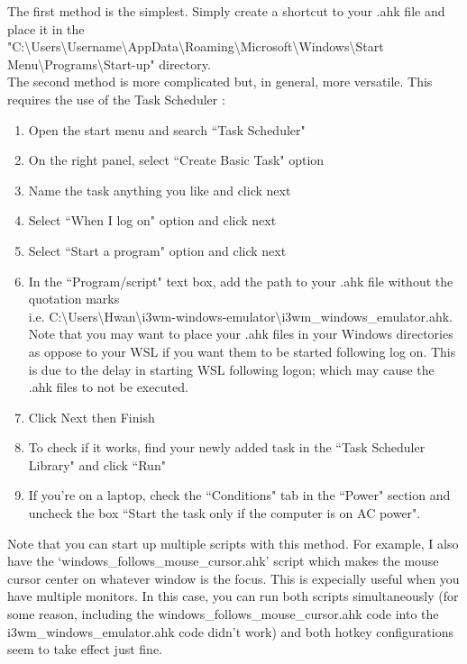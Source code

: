 The first method is the simplest. Simply create a shortcut to your .ahk file
and place it in the\\
"C:\textbackslash Users\textbackslash Username\textbackslash AppData\textbackslash Roaming\textbackslash Microsoft\textbackslash Windows\textbackslash Start Menu\textbackslash Programs\textbackslash Start-up" directory.\\

The second method is more complicated but, in general, more versatile. This
requires the use of the Task Scheduler \cite{bashkarla2016how}:
\begin{enumerate}
    \item Open the start menu and search ``Task Scheduler"
    \item On the right panel, select ``Create Basic Task" option
    \item Name the task anything you like and click next
    \item Select ``When I log on" option and click next
    \item Select ``Start a program" option and click next
    \item In the ``Program/script" text box, add the path to your .ahk file
        without the quotation marks\\
        i.e. C:\textbackslash Users\textbackslash Hwan\textbackslash i3wm-windows-emulator\textbackslash i3wm\_windows\_emulator.ahk.\\
        Note that you may want to place your .ahk files in your Windows
        directories as oppose to your WSL if you want them to be started
        following log on. This is due to the delay in starting WSL following
        logon; which may cause the .ahk files to not be executed.
    \item Click Next then Finish
    \item To check if it works, find your newly added task in the ``Task Scheduler Library" and
       click ``Run"
   \item If you're on a laptop, check the ``Conditions" tab in the ``Power"
       section and uncheck the box ``Start the task only if the computer is on
       AC power".
\end{enumerate}
Note that you can start up multiple scripts with this method. For example, I
also have the `windows\_follows\_mouse\_cursor.ahk' script which makes the mouse
cursor center on whatever window is the focus. This is expecially useful when
you have multiple monitors. In this case, you can run both scripts
simultaneously (for some reason, including the
windows\_follows\_mouse\_cursor.ahk code into the i3wm\_windows\_emulator.ahk
code didn't work) and both hotkey configurations seem to take effect just fine.

